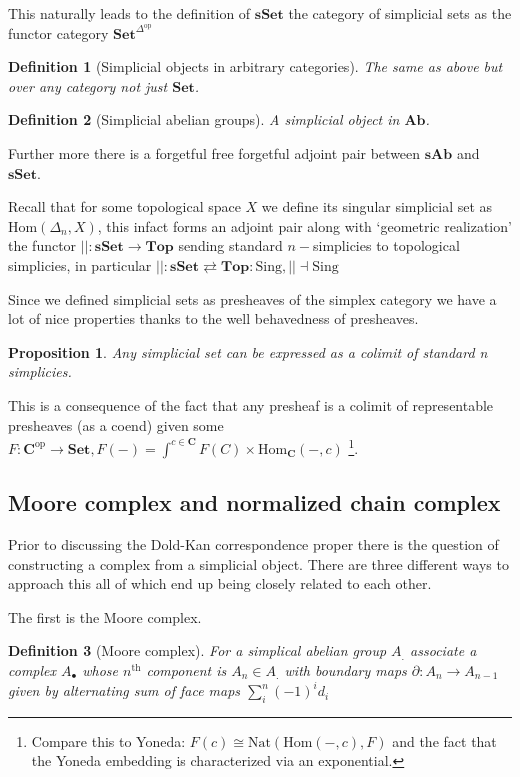 \documentclass[12pt]{article}
\numberwithin{equation}{section}
\newcommand{\Hom}{{\mathrm{Hom}}}
\newtheorem{definition}{Definition}[section]
\newtheorem{proposition}{Proposition}[section]
\begin{document}
	This naturally leads to the definition of $\mathbf{sSet}$ the category of simplicial sets as the functor category $\mathbf{Set}^{\Delta^\mathrm{op}}$
	\begin{definition}[Simplicial objects in arbitrary categories]
		The same as above but over any category not just $\mathbf{Set}$.
	\end{definition}
	
	\begin{definition}[Simplicial abelian groups]
		A simplicial object in $\mathbf{Ab}$.
	\end{definition}
	Further more there is a forgetful free forgetful adjoint pair between $\mathbf{sAb}$ and $\mathbf{sSet}$.
	
	Recall that for some topological space $X$ we define its singular simplicial set as $\Hom(\Delta_n,X)$, this infact forms an adjoint pair along with `geometric realization' the functor  $||: \mathbf{sSet} \to \mathbf{Top}$ sending standard $n-$simplicies to topological simplicies, in particular $||:\mathbf{sSet} \rightleftarrows \mathbf{Top}: \mathrm{Sing}, || \dashv \mathrm{Sing}$
	
	Since we defined simplicial sets as presheaves of the simplex category we have a lot of nice properties thanks to the well behavedness of presheaves.
	
	\begin{proposition}
		Any simplicial set can be expressed as a colimit of standard n simplicies.
	\end{proposition}
	This is a consequence of the fact that any presheaf is a colimit of representable presheaves (as a coend) given some $F: \mathbf{C}^\mathrm{op} \to \mathbf{Set}, F(-)= \int^{c \in \mathbf{C}} F(C) \times \mathrm{Hom}_\mathbf{C}(-,c)$ \footnote{Compare this to Yoneda: $F(c)\cong \mathrm{Nat}(\Hom(-,c),F)$ and the fact that the Yoneda embedding is characterized via an exponential.}. 
	
	\subsection{Moore complex and normalized chain complex}
	
	Prior to discussing the Dold-Kan correspondence proper there is the question of constructing a complex from a simplicial object. There are three different ways to approach this all of which end up being closely related to each other.
	
	The first is the Moore complex.
	\begin{definition}[Moore complex]
		For a simplical abelian group $A_.$ associate a complex $A_\bullet$ whose $n^\mathrm{th}$ component is $A_n \in A_.$ with boundary maps $\partial:A_n \to A_{n-1}$ given by alternating sum of face maps $\sum_i^n (-1)^i d_i$
	\end{definition}
	
\end{document}
